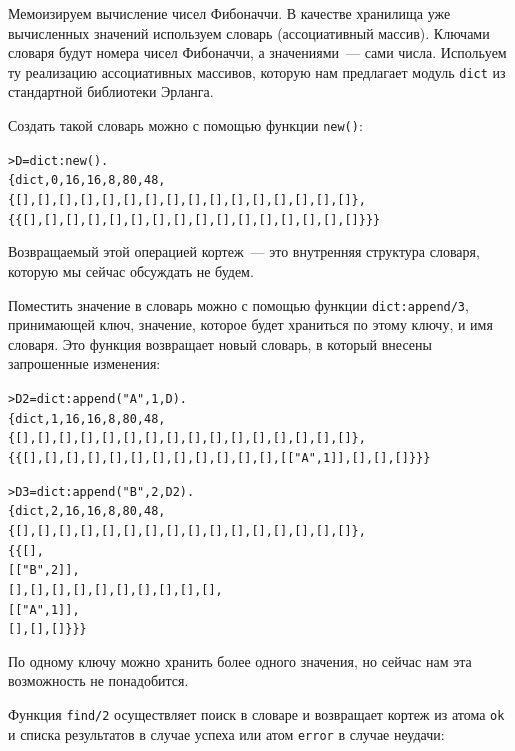 \documentclass[
  paper=a4,
  fontsize=14pt,
  openany,
  appendixprefix=true
]{scrbook}
\begin{document}
Мемоизируем вычисление чисел Фибоначчи. В качестве хранилища уже вычисленных значений используем словарь (ассоциативный массив). Ключами словаря будут номера чисел Фибоначчи, а значениями~--- сами числа. Испольуем ту реализацию ассоциативных массивов, которую нам предлагает модуль \lstinline{dict} из стандартной библиотеки Эрланга.

Создать такой словарь можно с помощью функции \lstinline{new()}:

\begin{alltt}
> D = dict:new().
\{dict,0,16,16,8,80,48,
      \{[],[],[],[],[],[],[],[],[],[],[],[],[],[],[],[]\},
      \{\{[],[],[],[],[],[],[],[],[],[],[],[],[],[],[],[]\}\}\}
\end{alltt}
\addtocounter{erlcommand}{1}

Возвращаемый этой операцией кортеж~--- это внутренняя структура словаря, которую мы сейчас обсуждать не будем.

Поместить значение в словарь можно с помощью функции \lstinline{dict:append/3}, принимающей ключ, значение, которое будет храниться по этому ключу, и имя словаря. Это функция возвращает новый словарь, в который внесены запрошенные изменения:

\begin{alltt}
> D2 = dict:append("A", 1, D).
\{dict,1,16,16,8,80,48,
      \{[],[],[],[],[],[],[],[],[],[],[],[],[],[],[],[]\},
      \{\{[],[],[],[],[],[],[],[],[],[],[],[],[["A",1]],[],[],[]\}\}\}
\end{alltt}
\addtocounter{erlcommand}{1}

\begin{alltt}
> D3 = dict:append("B", 2, D2).
\{dict,2,16,16,8,80,48,
      \{[],[],[],[],[],[],[],[],[],[],[],[],[],[],[],[]\},
      \{\{[],
        [["B",2]],
        [],[],[],[],[],[],[],[],[],[],
        [["A",1]],
        [],[],[]\}\}\}
\end{alltt}
\addtocounter{erlcommand}{1}

По одному ключу можно хранить более одного значения, но сейчас нам эта возможность не понадобится.

Функция \lstinline{find/2} осуществляет поиск в словаре и возвращает кортеж из атома \lstinline{ok} и списка результатов в случае успеха или атом \lstinline{error} в случае неудачи:
\end{document}
